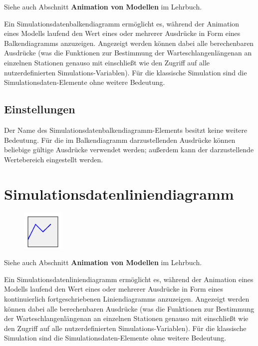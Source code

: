 Siehe auch Abschnitt \textbf{Animation von Modellen} im Lehrbuch.

Ein Simulationsdatenbalkendiagramm ermöglicht es, während der Animation eines Modells laufend den Wert
eines oder mehrerer Ausdrücke in Form eines Balkendiagramms anzuzeigen.
Angezeigt werden können dabei alle berechenbaren Ausdrücke (was die Funktionen zur Bestimmung der
Warteschlangenlängenan an einzelnen Stationen genauso mit einschließt wie den Zugriff auf alle
nutzerdefinierten Simulations-Variablen). Für die klassische Simulation sind die
Simulationsdaten-Elemente ohne weitere Bedeutung.

\subsection*{Einstellungen}

Der Name des Simulationsdatenbalkendiagramm-Elements besitzt keine weitere Bedeutung. Für die im
Balkendiagramm darzustellenden Ausdrücke können beliebige gültige Ausdrücke verwendet werden;
außerdem kann der darzustellende Wertebereich eingestellt werden.


\section{Simulationsdatenliniendiagramm}
\label{ref:ModelElementAnimationDiagram}

\begin{figure}
\vspace{-22pt}
\includegraphics[width=2cm]{imageModelElementAnimationDiagram.png}
\vspace{-22pt}
\end{figure}

Siehe auch Abschnitt \textbf{Animation von Modellen} im Lehrbuch.

Ein Simulationsdatenliniendiagramm ermöglicht es, während der Animation eines Modells laufend den Wert
eines oder mehrerer Ausdrücke in Form eines kontinuierlich fortgeschriebenen Liniendiagramms anzuzeigen.
Angezeigt werden können dabei alle berechenbaren Ausdrücke (was die Funktionen zur Bestimmung der
Warteschlangenlängenan an einzelnen Stationen genauso mit einschließt wie den Zugriff auf alle
nutzerdefinierten Simulations-Variablen). Für die klassische Simulation sind die
Simulationsdaten-Elemente ohne weitere Bedeutung.


